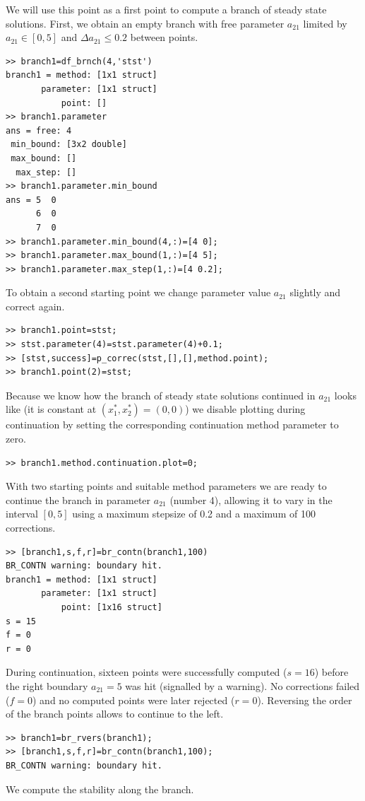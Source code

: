 \documentclass[10pt]{article}
\begin{document}
{We will use this point as a first point to compute a branch
of steady state solutions. 
First, we obtain an empty branch with free parameter $a_{21}$
limited by $a_{21}\in[0,5]$ and $\Delta a_{21}\leq 0.2$ between
points.
{\small\begin{verbatim}
>> branch1=df_brnch(4,'stst')
branch1 = method: [1x1 struct]
       parameter: [1x1 struct]
           point: []
>> branch1.parameter
ans = free: 4
 min_bound: [3x2 double]
 max_bound: []
  max_step: []
>> branch1.parameter.min_bound
ans = 5  0
      6  0
      7  0
>> branch1.parameter.min_bound(4,:)=[4 0];
>> branch1.parameter.max_bound(1,:)=[4 5];
>> branch1.parameter.max_step(1,:)=[4 0.2];
\end{verbatim}}
To obtain
a second starting point we change  
parameter value $a_{21}$ slightly and correct again. 
{\small\begin{verbatim}
>> branch1.point=stst;
>> stst.parameter(4)=stst.parameter(4)+0.1;
>> [stst,success]=p_correc(stst,[],[],method.point);
>> branch1.point(2)=stst;
\end{verbatim}}
Because we know how the branch of steady state solutions
continued in $a_{21}$ looks like (it is constant at
$(x_1^*,x_2^*)=(0,0)$) we disable plotting during continuation
by setting the corresponding continuation method parameter to zero.
{\small\begin{verbatim}
>> branch1.method.continuation.plot=0;
\end{verbatim}}
With two starting points and suitable method parameters 
we are ready to continue the branch in parameter $a_{21}$ (number 4),
allowing it to vary in the interval $[0,5]$ using a maximum
stepsize of 0.2 and 
a maximum of 100 corrections.
{\small\begin{verbatim}
>> [branch1,s,f,r]=br_contn(branch1,100)
BR_CONTN warning: boundary hit.
branch1 = method: [1x1 struct]
       parameter: [1x1 struct]
           point: [1x16 struct]
s = 15
f = 0
r = 0
\end{verbatim}}
During continuation, 
sixteen points were successfully computed ($s=16$)
before the right boundary $a_{21}=5$ was hit (signalled by a warning). 
No corrections failed ($f=0$) and no computed points were later
rejected ($r=0$). Reversing the order of the branch points
allows to continue to the left.
{\small\begin{verbatim}
>> branch1=br_rvers(branch1);
>> [branch1,s,f,r]=br_contn(branch1,100);
BR_CONTN warning: boundary hit.
\end{verbatim}}
We compute the stability along the branch.
}
\end{document}
